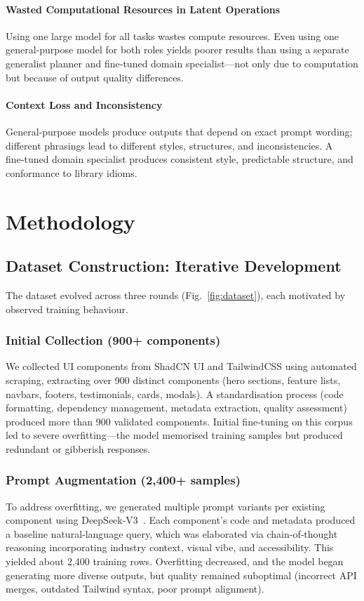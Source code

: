 \documentclass[pdflatex,sn-mathphys-num]{sn-jnl}
\theoremstyle{thmstyleone}
\theoremstyle{thmstyletwo}
\theoremstyle{thmstylethree}
\begin{document}
\paragraph{Wasted Computational Resources in Latent Operations}
Using one large model for all tasks wastes compute resources. Even using one general‑purpose model for both roles yields poorer results than using a separate generalist planner and fine‑tuned domain specialist—not only due to computation but because of output quality differences.

\paragraph{Context Loss and Inconsistency}
General‑purpose models produce outputs that depend on exact prompt wording; different phrasings lead to different styles, structures, and inconsistencies. A fine‑tuned domain specialist produces consistent style, predictable structure, and conformance to library idioms.

\section{Methodology}\label{sec:methodology}

\subsection{Dataset Construction: Iterative Development}

The dataset evolved across three rounds (Fig.~\ref{fig:dataset}), each motivated by observed training behaviour.

\subsubsection{Initial Collection (900+ components)}
We collected UI components from ShadCN UI and TailwindCSS using automated scraping, extracting over 900 distinct components (hero sections, feature lists, navbars, footers, testimonials, cards, modals). A standardisation process (code formatting, dependency management, metadata extraction, quality assessment) produced more than 900 validated components. Initial fine‑tuning on this corpus led to severe overfitting—the model memorised training samples but produced redundant or gibberish responses.

\subsubsection{Prompt Augmentation (2,400+ samples)}
To address overfitting, we generated multiple prompt variants per existing component using DeepSeek-V3~\cite{ref6}. Each component's code and metadata produced a baseline natural‑language query, which was elaborated via chain‑of‑thought reasoning incorporating industry context, visual vibe, and accessibility. This yielded about 2,400 training rows. Overfitting decreased, and the model began generating more diverse outputs, but quality remained suboptimal (incorrect API merges, outdated Tailwind syntax, poor prompt alignment).
\end{document}
